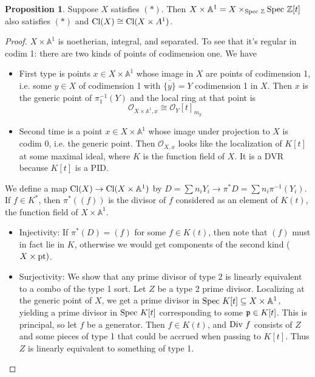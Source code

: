 \documentclass[10pt,reqno]{amsart}
\theoremstyle{definition}
\newtheorem{proposition}[theorem]{Proposition}
\theoremstyle{remark}
\numberwithin{equation}{section}
\numberwithin{theorem}{section}
\newcommand*{\red}{\textcolor{red}}
\newcommand{\Z}{{\mathbb Z}}
\newcommand{\OO}{{\mathcal O}}
\newcommand{\spec}{\textup{Spec }}
\newcommand{\Div}{\textup{Div }}
\newcommand{\cl}{\textup{Cl}}
\newcommand{\pp}{\frak{p}}
\newcommand{\A}{{\mathbb A}}
\begin{document}
\begin{proposition} Suppose $X$ satisfies $(\ast)$. Then $X \times \A^1 = X \times_{\spec \Z} \spec \Z[t]$ also satisfies $(\ast)$ and $\cl(X) \cong \cl(X \times A^1)$.
\end{proposition}
\begin{proof}
$X \times \A^1$ is noetherian, integral, and separated. To see that it's regular in codim 1: there are two kinds of points of codimension one. We have 
\begin{itemize}
\item First type is points $x \in X \times \A^1$ whose image in $X$ are points of codimension 1, i.e. some $y \in X$ of codimension 1 with $\overline{\{y\}} = Y$ codimension 1 in $X$. Then $x$ is the generic point of $\pi_1^{-1}(Y)$ and the local ring at that point is
\[\OO_{X \times \A^1,x} \cong \OO_Y[t]_{m_y} \]
\item Second time is a point $x \in X \times \A^1$ whose image under projection to $X$ is codim 0, i.e. the generic point. Then $\OO_{X,x}$ looks like the localization of $K[t]$ at some maximal ideal, where $K$ is the function field of $X$. It is a DVR because $K[t]$ is a PID.
\end{itemize}

We define a map $\cl(X) \to \cl(X \times \A^1)$ by $D = \sum n_i Y_i \to \pi^* D =  \sum n_i \pi^{-1}(Y_i)$. If $f \in K^*$, then $\pi^*((f))$ is the divisor of $f$ considered as an element of $K(t)$, the function field of $X \times \A^1$.

\begin{itemize}
\item Injectivity: If $\pi^*(D) = (f)$ for some $f \in K(t)$, then note that $(f)$ must in fact lie in $K$, otherwise we would get components of the second kind ($X \times \textup{pt})$.
\item Surjectivity: We show that any prime divisor of type 2 is linearly equivalent to a combo of the type 1 sort. Let $Z$ be a type 2 prime divisor. Localizing at the generic point of $X$, we get a prime divisor in $\spec K[t] \subseteq X \times \A^1$, yielding a prime divisor in $\spec K[t]$ corresponding to some $\pp \in K[t]$. This is principal, so let $f$ be a generator. Then $f \in K(t)$, and $\Div f$ consists of $Z$ and some pieces of type 1 that could be accrued when passing to $K[t]$. Thus $Z$ is linearly equivalent to something of type 1.
\end{itemize}
\end{proof}
\end{document}
